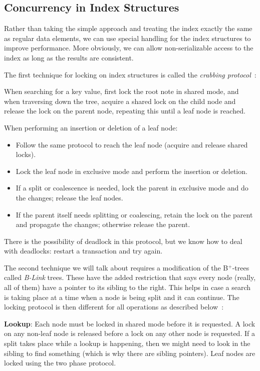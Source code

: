 \documentclass[a4paper]{report}
\begin{document}
\subsection*{Concurrency in Index Structures}

Rather than taking the simple approach and treating the index exactly the same as regular data elements, we can use special handling for the index structures to improve performance. More obviously, we can allow non-serializable access to the index as long as the results are consistent. 

The first technique for locking on index structures is called the \textit{crabbing protocol}~\cite{dsc}:

When searching for a key value, first lock the root note in shared mode, and when traversing down the tree, acquire a shared lock on the child node and release the lock on the parent node, repeating this until a leaf node is reached.

When performing an insertion or deletion of a leaf node:
\begin{itemize}
	\item Follow the same protocol to reach the leaf node (acquire and release shared locks).
	\item Lock the leaf node in exclusive mode and perform the insertion or deletion.
	\item If a split or coalescence is needed, lock the parent in exclusive mode and do the changes; release the leaf nodes.
	\item If the parent itself needs splitting or coalescing, retain the lock on the parent and propagate the changes; otherwise release the parent.
\end{itemize}

There is the possibility of deadlock in this protocol, but we know how to deal with deadlocks: restart a transaction and try again.


The second technique we will talk about requires a modification of the B$^{+}$-trees called \textit{B-Link} trees. These have the added restriction that says every node (really, all of them) have a pointer to its sibling to the right. This helps in case a search is taking place at a time when a node is being split and it can continue. The locking protocol is then different for all operations as described below~\cite{dsc}:

\textbf{Lookup}: Each node must be locked in shared mode before it is requested. A lock on any non-leaf node is released before a lock on any other node is requested. If a split takes place while a lookup is happening, then we might need to look in the sibling to find something (which is why there are sibling pointers). Leaf nodes are locked using the two phase protocol.
\end{document}
